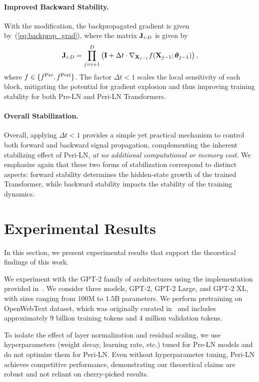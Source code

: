 \documentclass[journal]{IEEEtran}
\def\eqref#1{equation~\ref{#1}}
\newcommand{\bfI}{{\bf I}}
\newcommand{\bfJ}{{\bf J}}
\newcommand{\bfX}{{\bf X}}
\newcommand{\bftheta}{{\boldsymbol \theta}}
\renewcommand{\eqref}[1]{(\ref{#1})}
\theoremstyle{plain}
\theoremstyle{definition}
\theoremstyle{remark}
\begin{document}
\paragraph{Improved Backward Stability.}
With the modification, the backpropagated gradient is given by~\eqref{eq:backprop_grad}, where the matrix $\bfJ_{i:D}$ is given by
\begin{equation}
\label{eq:gradient_product_improved}
    \bfJ_{i:D} =  \prod_{j=i+1}^D \left( \bfI + \Delta t \cdot \nabla_{\bfX_{j-1}} f(\bfX_{j-1}; \bftheta_{j-1})\right) ,
\end{equation}
where $f \in \{ f^{\rm Pre}, f^{\rm Peri} \}$. The factor $\Delta t < 1$ scales the local sensitivity of each block, mitigating the potential for gradient explosion and thus improving training stability for both Pre-LN and Peri-LN Transformers.

\paragraph{Overall Stabilization.} Overall, applying $\Delta t<1$ provides a simple yet practical mechanism to control both forward and backward signal propagation, complementing the inherent stabilizing effect of Peri-LN, \emph{at no additional computational or memory cost}. We emphasize again that these two forms of stabilization correspond to distinct aspects: forward stability determines the hidden-state growth of the trained Transformer, while backward stability impacts the stability of the training dynamics.

\section{Experimental Results}
\label{sec:experiments}
In this section, we present experimental results that support the theoretical findings of this work.

We experiment with the GPT-2 family of architectures using the implementation provided in~\cite{Karpathy2022}. We consider three models, GPT-2, GPT-2 Large, and GPT-2 XL, with sizes ranging from $100$M to $1.5$B parameters. We perform pretraining on OpenWebText dataset, which was originally curated in~\cite{Gokaslan2019OpenWeb} 
and includes approximately 9 billion training tokens and 4 million validation tokens.

To isolate the effect of layer normalization and residual scaling, we use hyperparameters (weight decay, learning rate, etc.) tuned for Pre-LN models and do not optimize them for Peri-LN. Even without hyperparameter tuning, Peri-LN achieves competitive performance, demonstrating our theoretical claims are robust and not reliant on cherry-picked results.
\end{document}
